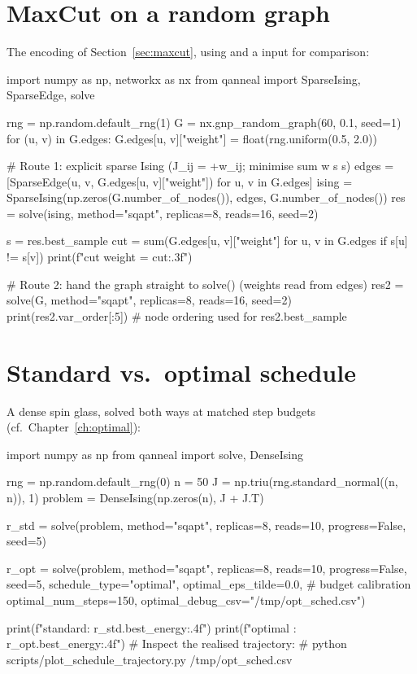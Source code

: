 \section{MaxCut on a random graph}

The encoding of Section~\ref{sec:maxcut}, using  and a
 input for comparison:

\begin{pycode}
import numpy as np, networkx as nx
from qanneal import SparseIsing, SparseEdge, solve

rng = np.random.default_rng(1)
G = nx.gnp_random_graph(60, 0.1, seed=1)
for (u, v) in G.edges:
    G.edges[u, v]["weight"] = float(rng.uniform(0.5, 2.0))

# Route 1: explicit sparse Ising (J_ij = +w_ij; minimise sum w s s)
edges = [SparseEdge(u, v, G.edges[u, v]["weight"]) for u, v in G.edges]
ising = SparseIsing(np.zeros(G.number_of_nodes()), edges,
                    G.number_of_nodes())
res = solve(ising, method="sqapt", replicas=8, reads=16, seed=2)

s = res.best_sample
cut = sum(G.edges[u, v]["weight"] for u, v in G.edges if s[u] != s[v])
print(f"cut weight = {cut:.3f}")

# Route 2: hand the graph straight to solve() (weights read from edges)
res2 = solve(G, method="sqapt", replicas=8, reads=16, seed=2)
print(res2.var_order[:5])   # node ordering used for res2.best_sample
\end{pycode}

\section{Standard vs.\ optimal schedule}

A dense spin glass, solved both ways at matched step budgets
(cf.\ Chapter~\ref{ch:optimal}):

\begin{pycode}
import numpy as np
from qanneal import solve, DenseIsing

rng = np.random.default_rng(0)
n = 50
J = np.triu(rng.standard_normal((n, n)), 1)
problem = DenseIsing(np.zeros(n), J + J.T)

r_std = solve(problem, method="sqapt", replicas=8, reads=10,
              progress=False, seed=5)

r_opt = solve(problem, method="sqapt", replicas=8, reads=10,
              progress=False, seed=5,
              schedule_type="optimal",
              optimal_eps_tilde=0.0,        # budget calibration
              optimal_num_steps=150,
              optimal_debug_csv="/tmp/opt_sched.csv")

print(f"standard: {r_std.best_energy:.4f}")
print(f"optimal : {r_opt.best_energy:.4f}")
# Inspect the realised trajectory:
#   python scripts/plot_schedule_trajectory.py /tmp/opt_sched.csv
\end{pycode}

